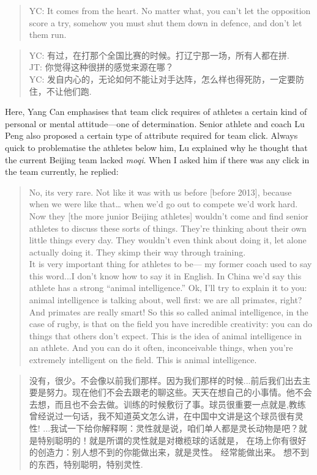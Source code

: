 \begin{CJK}{UTF8}{gbsn}
\begin{quote}
      YC: It comes from the heart. No matter what, you can't let the opposition score a try, somehow you must shut them down in defence, and don't let them run.
    \end{quote}

    \begin{quote}
      YC: 有过，在打那个全国比赛的时候。打辽宁那一场，所有人都在拼.\\
      JT: 你觉得这种很拼的感觉来源在哪？\\
      YC: 发自内心的，无论如何不能让对手达阵，怎么样也得死防，一定要防住，不让他们跑.
    \end{quote}

Here, Yang Can emphasises that team click requires of athletes a certain kind of personal or mental attitude---one of determination.   Senior athlete and coach Lu Peng also proposed a certain type of attribute required for team click.  Always quick to problematise the athletes below him, Lu explained why he thought that the current Beijing team lacked \textit{moqi}.  When I asked him if there was any click in the team currently, he replied:

      \begin{quote}
        No, its very rare.  Not like it was with us before [before 2013], because when we were like that… when we'd go out to compete we'd work hard.  Now they [the more junior Beijing athletes] wouldn't come and find senior athletes to discuss these sorts of things.  They're thinking about their own little things every day.  They wouldn't even think about doing it, let alone actually doing it.  They skimp their way through training.  \\

        It is very important thing for athletes to be--- my former coach used to say this word...I don't know how to say it in English.  In China we'd say this athlete has a strong ``animal intelligence.'' Ok, I'll try to explain it to you: animal intelligence is talking about, well first: we are all primates, right?  And primates are really smart!  So this so called animal intelligence, in the case of rugby, is that on the field you have incredible creativity: you can do things that others don't expect.  This is the idea of animal intelligence in an athlete.  And you can do it often, inconceivable things, when you're extremely intelligent on the field. This is animal intelligence.
      \end{quote}

      \begin{quote}
        没有，很少。不会像以前我们那样。因为我们那样的时候...前后我们出去主要是努力。现在他们不会去跟老的聊这些。天天在想自己的小事情。他不会去想，而且也不会去做。训练的时候敷衍了事。球员很重要一点就是,教练曾经说过一句话，我不知道英文怎么讲，在中国中文讲是这个球员很有灵性! ...我试一下给你解释啊：灵性就是说，咱们单人都是灵长动物是吧？就是特别聪明的！就是所谓的灵性就是对橄榄球的话就是， 在场上你有很好的创造力：别人想不到的你能做出来，就是灵性。 经常能做出来。 想不到的东西，特别聪明，特别灵性.
      \end{quote}


\end{CJK}
